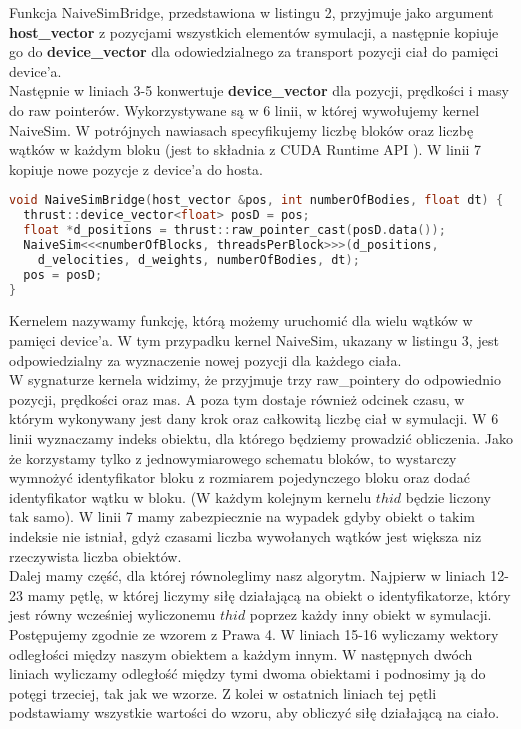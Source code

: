 \documentclass[14pt,twoside,a4paper]{article}
\theoremstyle{definition}
\begin{document}
Funkcja NaiveSimBridge, przedstawiona w listingu 2, przyjmuje jako argument \textbf{host\_vector} z pozycjami wszystkich elementów symulacji, a następnie kopiuje go do \textbf{device\_vector} dla odowiedzialnego za transport pozycji ciał do pamięci device'a. \\Następnie w liniach 3-5 konwertuje \textbf{device\_vector} dla pozycji, prędkości i masy do raw pointerów. Wykorzystywane są w 6 linii, w której wywołujemy kernel NaiveSim. W potrójnych nawiasach specyfikujemy liczbę bloków oraz liczbę wątków w każdym bloku (jest to składnia z CUDA Runtime API \cite{runtimeApi}). 
W linii 7 kopiuje nowe pozycje z device'a do hosta. 
\bigskip
{}\begin{lstlisting}[language=C++, frame=single, framerule=2pt, caption=Bridge pomiędzy główną pętlą a kernelem]
void NaiveSimBridge(host_vector &pos, int numberOfBodies, float dt) {
  thrust::device_vector<float> posD = pos;
  float *d_positions = thrust::raw_pointer_cast(posD.data());
  NaiveSim<<<numberOfBlocks, threadsPerBlock>>>(d_positions, 
  	d_velocities, d_weights, numberOfBodies, dt);
  pos = posD;
}
\end{lstlisting}
\bigskip
Kernelem nazywamy funkcję, którą możemy uruchomić dla wielu wątków w pamięci device'a. W tym przypadku kernel NaiveSim, ukazany w listingu 3, jest odpowiedzialny za wyznaczenie nowej pozycji dla każdego ciała. \\
\bigskip
W sygnaturze kernela widzimy, że przyjmuje trzy raw\_pointery do odpowiednio pozycji, prędkości oraz mas. A poza tym dostaje również  odcinek czasu, w którym wykonywany jest dany krok oraz całkowitą liczbę ciał w symulacji. W 6 linii wyznaczamy indeks obiektu, dla którego będziemy prowadzić obliczenia. Jako że korzystamy tylko z jednowymiarowego schematu bloków, to wystarczy wymnożyć identyfikator bloku z rozmiarem pojedynczego bloku oraz dodać identyfikator wątku w bloku. (W każdym kolejnym kernelu $thid$ będzie liczony tak samo).
W linii 7 mamy zabezpiecznie na wypadek gdyby obiekt o takim indeksie nie istniał, gdyż czasami liczba wywołanych wątków jest większa niz rzeczywista liczba obiektów. \\
\bigskip
Dalej mamy część, dla której równoleglimy nasz algorytm. Najpierw w liniach 12-23 mamy pętlę, w której liczymy siłę działającą na obiekt o identyfikatorze, który jest równy wcześniej wyliczonemu $thid$ poprzez każdy inny obiekt w symulacji. Postępujemy zgodnie ze wzorem z Prawa 4. W liniach 15-16 wyliczamy wektory odległości między naszym obiektem a każdym innym. W następnych dwóch liniach wyliczamy odległość między tymi dwoma obiektami i podnosimy ją do potęgi trzeciej, tak jak we wzorze. Z kolei w ostatnich liniach tej pętli podstawiamy wszystkie wartości do wzoru, aby obliczyć siłę działającą na ciało. \\
\end{document}
